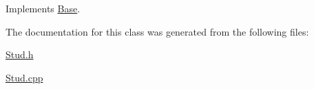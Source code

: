 Implements \mbox{\hyperlink{class_base_aa096e05aae5778d7ebb03a8b6f775e33}{Base}}.



The documentation for this class was generated from the following files\+:\begin{DoxyCompactItemize}
\item 
\mbox{\hyperlink{_stud_8h}{Stud.\+h}}\item 
\mbox{\hyperlink{_stud_8cpp}{Stud.\+cpp}}\end{DoxyCompactItemize}
